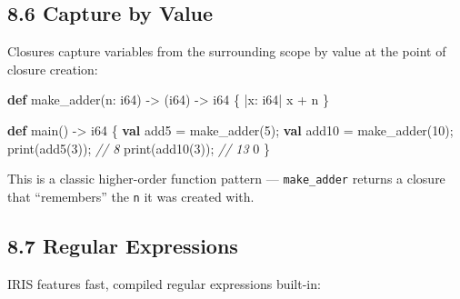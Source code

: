 \documentclass[
  english,
]{book}
\newenvironment{Shaded}{\begin{snugshade}}{\end{snugshade}}
\newcommand{\CommentTok}[1]{\textcolor[rgb]{0.42,0.60,0.33}{\textit{#1}}}
\newcommand{\DataTypeTok}[1]{\textcolor[rgb]{0.31,0.79,0.69}{#1}}
\newcommand{\DecValTok}[1]{\textcolor[rgb]{0.71,0.81,0.66}{#1}}
\newcommand{\FunctionTok}[1]{\textcolor[rgb]{0.86,0.86,0.67}{#1}}
\newcommand{\KeywordTok}[1]{\textcolor[rgb]{0.34,0.61,0.84}{\textbf{#1}}}
\newcommand{\NormalTok}[1]{\textcolor[rgb]{0.83,0.83,0.83}{#1}}
\newcommand{\OperatorTok}[1]{\textcolor[rgb]{0.83,0.83,0.83}{#1}}
\begin{document}
\subsection{8.6 Capture by Value}\label{capture-by-value}

Closures capture variables from the surrounding scope by value at the
point of closure creation:

\begin{Shaded}
\begin{Highlighting}[]
\KeywordTok{def}\NormalTok{ make\_adder(n: }\DataTypeTok{i64}\NormalTok{) }\OperatorTok{{-}\textgreater{}}\NormalTok{ (}\DataTypeTok{i64}\NormalTok{) }\OperatorTok{{-}\textgreater{}} \DataTypeTok{i64}\NormalTok{ \{}
    \OperatorTok{|}\NormalTok{x: }\DataTypeTok{i64}\OperatorTok{|}\NormalTok{ x }\OperatorTok{+}\NormalTok{ n}
\NormalTok{\}}

\KeywordTok{def}\NormalTok{ main() }\OperatorTok{{-}\textgreater{}} \DataTypeTok{i64}\NormalTok{ \{}
    \KeywordTok{val}\NormalTok{ add5 }\OperatorTok{=}\NormalTok{ make\_adder(}\DecValTok{5}\NormalTok{);}
    \KeywordTok{val}\NormalTok{ add10 }\OperatorTok{=}\NormalTok{ make\_adder(}\DecValTok{10}\NormalTok{);}
    \FunctionTok{print}\NormalTok{(add5(}\DecValTok{3}\NormalTok{));    }\CommentTok{// 8}
    \FunctionTok{print}\NormalTok{(add10(}\DecValTok{3}\NormalTok{));   }\CommentTok{// 13}
    \DecValTok{0}
\NormalTok{\}}
\end{Highlighting}
\end{Shaded}

This is a classic higher-order function pattern --- \texttt{make\_adder}
returns a closure that ``remembers'' the \texttt{n} it was created with.

\subsection{8.7 Regular Expressions}\label{regular-expressions}

IRIS features fast, compiled regular expressions built-in:
\end{document}
